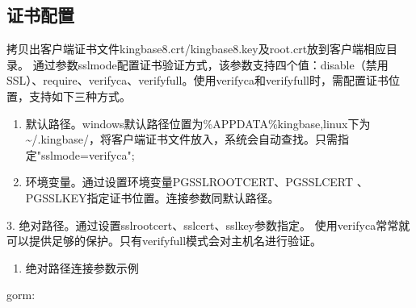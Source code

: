 \documentclass[a4,10pt,oneside,english]{sphinxmanual}
\begin{document}
\subsection{证书配置}
\label{\detokenize{interface/SSL:id3}}
拷贝出客户端证书文件kingbase8.crt/kingbase8.key及root.crt放到客户端相应目录。
通过参数sslmode配置证书验证方式，该参数支持四个值：disable（禁用SSL）、require、verify\sphinxhyphen{}ca、verify\sphinxhyphen{}full。使用verify\sphinxhyphen{}ca和verify\sphinxhyphen{}full时，需配置证书位置，支持如下三种方式。
\begin{enumerate}
%
\item {} 
默认路径。windows默认路径位置为\%APPDATA\%kingbase,linux下为\textasciitilde{}/.kingbase/，将客户端证书文件放入，系统会自动查找。只需指定"sslmode=verify\sphinxhyphen{}ca";

\item {} 
环境变量。通过设置环境变量PGSSLROOTCERT、PGSSLCERT 、PGSSLKEY指定证书位置。连接参数同默认路径。

\end{enumerate}

3. 绝对路径。通过设置sslrootcert、sslcert、sslkey参数指定。
使用verify\sphinxhyphen{}ca常常就可以提供足够的保护。只有verify\sphinxhyphen{}full模式会对主机名进行验证。
\begin{enumerate}
%
\setcounter{enumi}{3}
\item {} 
绝对路径连接参数示例

\end{enumerate}

gorm:
\end{document}

